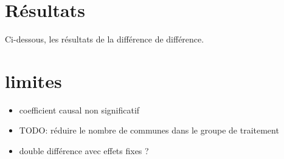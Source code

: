 \documentclass[a4paper,12pt]{article}
\begin{document}
\section{Résultats}

Ci-dessous, les résultats de la différence de différence. \newline



\section{limites}
\begin{itemize}
\item coefficient causal non significatif
\item TODO: réduire le nombre de communes dans le groupe de traitement
\item double différence avec effets fixes ?
\end{itemize}
\end{document}
